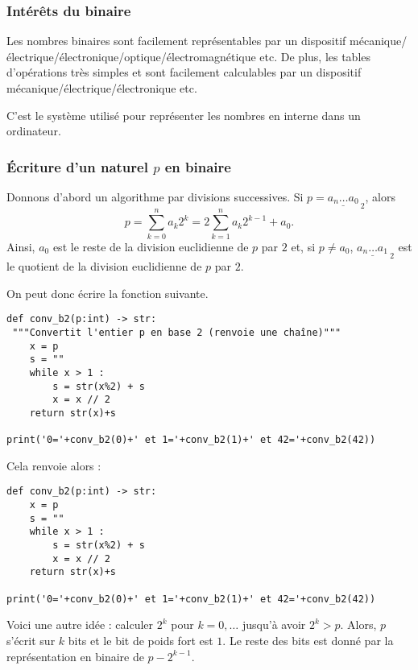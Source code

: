 \subsubsection{Intérêts du binaire}
Les nombres binaires sont facilement représentables par un dispositif
  mécanique/électrique/électronique/optique/électromagnétique etc.
De plus, les tables d'opérations très simples et sont facilement calculables par un
  dispositif mécanique/électrique/électronique etc.

C'est le système utilisé pour représenter les nombres en interne dans
un ordinateur.

\subsubsection{Écriture d'un naturel $p$ en binaire}

Donnons d'abord un algorithme par divisions successives.
Si $p = \underline{a_n\dots a_0}_{~2}$, alors 
$$ p = \sum_{k=0}^n a_k 2^k = 2\sum_{k=1}^n a_k2^{k-1} + a_0.$$
Ainsi, $a_0$ est le reste de la division euclidienne de $p$ par $2$ et, si $p\neq a_0$, $\underline{a_n\dots a_1}_{~2}$ est le quotient de la division euclidienne de $p$ par $2$.

On peut donc écrire la fonction suivante.



\begin{lstlisting}
def conv_b2(p:int) -> str:
 """Convertit l'entier p en base 2 (renvoie une chaîne)"""
    x = p
    s = ""
    while x > 1 :
        s = str(x%2) + s
        x = x // 2
    return str(x)+s

print('0='+conv_b2(0)+' et 1='+conv_b2(1)+' et 42='+conv_b2(42))
\end{lstlisting}



Cela renvoie alors :

\begin{lstlisting}
def conv_b2(p:int) -> str:
    x = p
    s = ""
    while x > 1 :
        s = str(x%2) + s
        x = x // 2
    return str(x)+s

print('0='+conv_b2(0)+' et 1='+conv_b2(1)+' et 42='+conv_b2(42))
\end{lstlisting}



Voici une autre idée : calculer $2^{k}$ pour $k=0, \ldots$ jusqu'à avoir $2^{k} >
  p$. Alors, $p$ s'écrit sur $k$ bits et le bit de poids fort est
  $1$. Le reste des bits est donné par la représentation en binaire de
  $p-2^{k-1}$.


